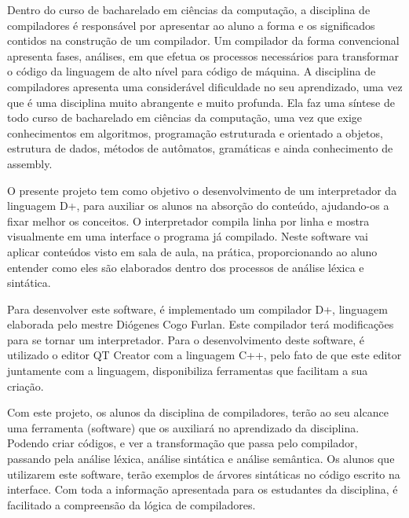 \documentclass[12pt,oneside,a4paper,chapter=TITLE,section=TITLE,sumario=tradicional]{abntex2}
\begin{document}
Dentro do curso de bacharelado em ciências da computação, a disciplina de compiladores é responsável por apresentar ao aluno a forma e os significados contidos na construção de um compilador. Um compilador da forma convencional apresenta fases, análises, em que efetua os processos necessários para transformar o código da linguagem de alto nível para código de máquina. A disciplina de compiladores apresenta uma considerável dificuldade no seu aprendizado, uma vez que é uma disciplina muito abrangente e muito profunda. Ela faz uma síntese de todo curso de bacharelado em ciências da computação, uma vez que exige conhecimentos em algoritmos, programação estruturada e orientado a objetos, estrutura de dados, métodos de autômatos, gramáticas e ainda conhecimento de assembly. 

O presente projeto tem como objetivo o desenvolvimento de um interpretador da linguagem D+, para auxiliar os alunos na absorção do conteúdo, ajudando-os a fixar melhor os conceitos. O interpretador compila linha por linha e mostra visualmente em uma interface o programa já compilado. Neste software vai aplicar conteúdos visto em sala de aula, na prática, proporcionando ao aluno entender como eles são elaborados dentro dos processos de análise léxica e sintática.

Para desenvolver este software, é implementado um compilador D+, linguagem elaborada pelo mestre Diógenes Cogo Furlan. Este compilador terá modificações para se tornar um interpretador. Para o desenvolvimento deste software, é utilizado o editor QT Creator com a linguagem C++, pelo fato de que este editor juntamente com a linguagem, disponibiliza ferramentas que facilitam a sua criação.

Com este projeto, os alunos da disciplina de compiladores, terão ao seu alcance uma ferramenta (software) que os auxiliará no aprendizado da disciplina. Podendo criar códigos, e ver a transformação que passa pelo compilador, passando pela análise léxica, análise sintática e análise semântica. Os alunos que utilizarem este software, terão exemplos de árvores sintáticas no código escrito na interface. Com toda a informação apresentada para os estudantes da disciplina, é facilitado a compreensão da lógica de compiladores.

\end{document}
